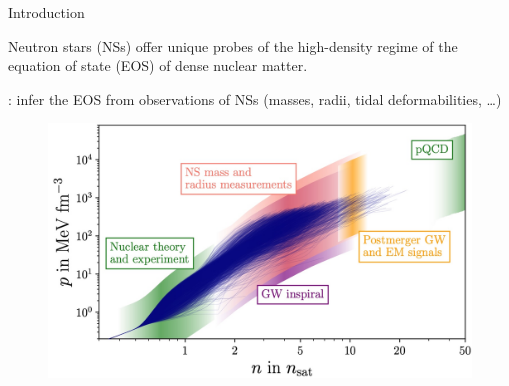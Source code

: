 \documentclass[usenames,dvipsnames,t]{beamer}
\begin{document}







\begin{frame}{Introduction}
  \def\x{4mm}

  Neutron stars (NSs) offer unique probes of the high-density regime of the equation of state (EOS) of dense nuclear matter.

  \vspace{\x}

  : infer the EOS from observations of NSs (masses, radii, tidal deformabilities, \dots)

  \begin{figure}
    \centering
    \includegraphics[width=0.75\linewidth]{Figures/Koehn_EOS.jpg}
  \end{figure}

\end{frame}
\end{document}
